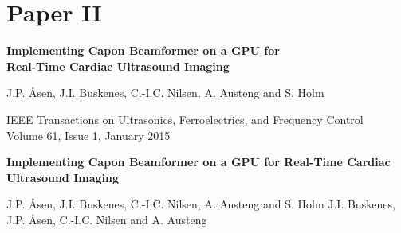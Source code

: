 {}



\graphicspath{{../HRUIonGPU/}}


\overfullrule=1mm
\cleardoublepage
\pagestyle{empty}

{
\setlength\parskip{\baselineskip}
\renewcommand\baselinestretch{1.1}


\chapter{Paper II}\label{ch:paperII}


{\Large\bf Implementing Capon Beamformer on a GPU for\\ Real-Time Cardiac Ultrasound Imaging}

J.P. Åsen, J.I. Buskenes, C.-I.C. Nilsen, A. Austeng and S. Holm

IEEE Transactions on Ultrasonics, Ferroelectrics, and Frequency Control\\
Volume 61, Issue 1, January 2015%
}


\cleardoublepage
\pagestyle{normal}
\thispagestyle{plain}

\begin{center}
{\Large\bf Implementing Capon Beamformer on a GPU for Real-Time Cardiac Ultrasound Imaging}

\vspace{\baselineskip}
J.P. Åsen, J.I. Buskenes, C.-I.C. Nilsen, A. Austeng and S. Holm
J.I. Buskenes, J.P. Åsen, C.-I.C. Nilsen and A. Austeng
\end{center}


{

   
}
   
% 
% 
%    


